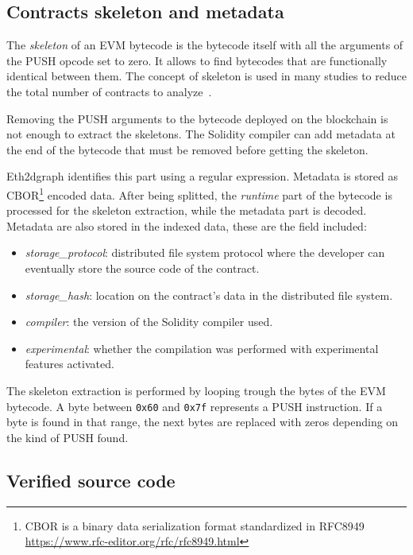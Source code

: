 \subsection{Contracts skeleton and metadata}
\label{skeleton-section}
The \textit{skeleton} of an EVM bytecode is the bytecode itself with all the arguments of the PUSH opcode set to zero. It allows to find bytecodes that are functionally identical between them. The concept of skeleton is used in many studies to reduce the total number of contracts to analyze~\cite{token-contracts}\cite{wallet-contracts}.

Removing the PUSH arguments to the bytecode deployed on the blockchain is not enough to extract the skeletons. The Solidity compiler can add metadata at the end of the bytecode that must be removed before getting the skeleton.  

Eth2dgraph identifies this part using a regular expression. Metadata is stored as CBOR\footnote{CBOR is a binary data serialization format standardized in RFC8949 \url{https://www.rfc-editor.org/rfc/rfc8949.html}} encoded data. After being splitted, the \textit{runtime} part of the bytecode is processed for the skeleton extraction, while the metadata part is decoded. Metadata are also stored in the indexed data, these are the field included:

\begin{itemize}
    \item \textit{storage\_protocol}: distributed file system protocol where the developer can eventually store the source code of the contract.
    \item \textit{storage\_hash}: location on the contract's data in the distributed file system.
    \item \textit{compiler}: the version of the Solidity compiler used.
    \item \textit{experimental}: whether the compilation was performed with experimental features activated.
\end{itemize}

The skeleton extraction is performed by looping trough the bytes of the EVM bytecode. A byte between \texttt{0x60} and \texttt{0x7f} represents a PUSH instruction. If a byte is found in that range, the next bytes are replaced with zeros depending on the kind of PUSH found. 

\subsection{Verified source code}

